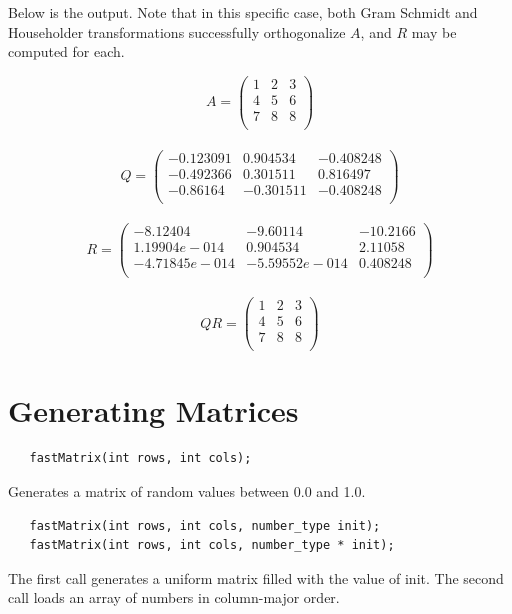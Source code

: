 \documentclass[10pt,fullpage]{article}
\begin{document}
\newpage

Below is the output. Note that in this specific case, both Gram
Schmidt and Householder transformations successfully orthogonalize
$A$, and $R$ may be computed for each.

$$A = \left( \begin{array}{ccc}1 & 2 & 3\\
4 & 5 & 6\\
7 & 8 & 8\\
\end{array} \right) $$\\[10pt]
$$Q = \left( \begin{array}{ccc}-0.123091 & 0.904534 & -0.408248\\
-0.492366 & 0.301511 & 0.816497\\
-0.86164 & -0.301511 & -0.408248\\
\end{array} \right) $$\\[10pt]
$$R = \left( \begin{array}{ccc}-8.12404 & -9.60114 & -10.2166\\
1.19904e-014 & 0.904534 & 2.11058\\
-4.71845e-014 & -5.59552e-014 & 0.408248\\
\end{array} \right) $$\\[10pt]
$$QR = \left( \begin{array}{ccc}1 & 2 & 3\\
4 & 5 & 6\\
7 & 8 & 8\\
\end{array} \right) $$

\newpage

\section{Generating Matrices}

\begin{verbatim}
   fastMatrix(int rows, int cols);
\end{verbatim}

Generates a matrix of random values between 0.0 and 1.0.

\begin{verbatim}
   fastMatrix(int rows, int cols, number_type init);
   fastMatrix(int rows, int cols, number_type * init);
\end{verbatim}

The first call generates a uniform matrix filled with the value of
init. The second call loads an array of numbers in column-major
order.
\end{document}
